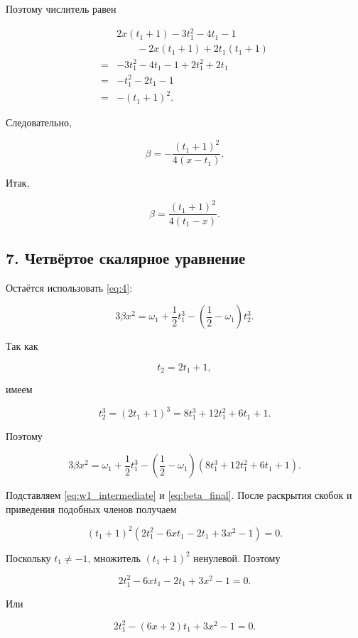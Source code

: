 \documentclass[a4paper,12pt]{article}
\begin{document}
	Поэтому числитель равен
	
	\begin{align*}
		&
		2x(t_1+1)-3t_1^2-4t_1-1
		\\
		&\qquad
		-2x(t_1+1)+2t_1(t_1+1)
		\\
		={}&
		-3t_1^2-4t_1-1
		+2t_1^2+2t_1
		\\
		={}&
		-t_1^2-2t_1-1
		\\
		={}&
		-(t_1+1)^2.
	\end{align*}
	
	Следовательно,
	
	\[
	\beta
	=
	-\frac{(t_1+1)^2}{4(x-t_1)}.
	\]
	
	Итак,
	
	\begin{equation}
		\boxed{
			\beta
			=
			\frac{(t_1+1)^2}{4(t_1-x)}.
		}
		\label{eq:beta_final}
	\end{equation}
	
	\subsection*{7. Четвёртое скалярное уравнение}
	
	Остаётся использовать \eqref{eq:4}:
	
	\[
	3\beta x^2
	=
	\omega_1+\frac12t_1^3
	-
	\left(\frac12-\omega_1\right)t_2^3.
	\]
	
	Так как
	
	\[
	t_2=2t_1+1,
	\]
	
	имеем
	
	\[
	t_2^3
	=
	(2t_1+1)^3
	=
	8t_1^3+12t_1^2+6t_1+1.
	\]
	
	Поэтому
	
	\[
	3\beta x^2
	=
	\omega_1+\frac12t_1^3
	-
	\left(\frac12-\omega_1\right)
	(8t_1^3+12t_1^2+6t_1+1).
	\]
	
	Подставляем \eqref{eq:w1_intermediate} и \eqref{eq:beta_final}. После раскрытия скобок и приведения подобных членов получаем
	
	\begin{equation}
		(t_1+1)^2
		\left(
		2t_1^2-6xt_1-2t_1+3x^2-1
		\right)=0.
	\end{equation}
	
	Поскольку $t_1\neq -1$, множитель $(t_1+1)^2$ ненулевой. Поэтому
	
	\[
	2t_1^2-6xt_1-2t_1+3x^2-1=0.
	\]
	
	Или
	
	\begin{equation}
		\boxed{
			2t_1^2-(6x+2)t_1+3x^2-1=0.
		}
		\label{eq:quadratic}
	\end{equation}
	
\end{document}
